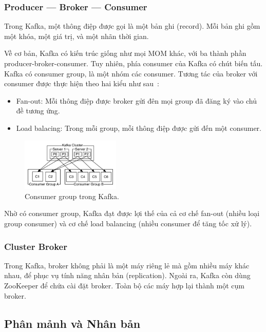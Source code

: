 \documentclass{article}
\begin{document}
\subsubsection{Producer --- Broker --- Consumer}

Trong Kafka, một thông điệp được gọi là một bản ghi (record). Mỗi bản ghi gồm
một khóa, một giá trị, và một nhãn thời gian.

Về cơ bản, Kafka có kiến trúc giống như mọi MOM khác, với ba thành phần
producer-broker-consumer. Tuy nhiên, phía consumer của Kafka có chút biến tấu.
Kafka có consumer group, là một nhóm các consumer. Tương tác của broker với
consumer được thực hiện theo hai kiểu như sau~\cite{kafka_detail}:

\begin{itemize}
    \item Fan-out: Mỗi thông điệp được broker gửi đên mọi group đã đăng ký vào
        chủ đề tương ứng.
    \item Load balacing: Trong mỗi group, mỗi thông điệp được gửi đến một
        consumer.
\end{itemize}

\begin{figure}
    \centering
    \includegraphics[width=0.42\textwidth]{consumer_groups.png}
    \caption{Consumer group trong Kafka.}
\end{figure}

Nhờ có consumer group, Kafka đạt được lợi thế của cả cơ chế fan-out (nhiều loại
group consumer) và cơ chế load balancing (nhiều consumer để tăng tốc xử lý).

\subsubsection{Cluster Broker}

Trong Kafka, broker không phải là một máy riêng lẻ mà gồm nhiều máy khác nhau,
để phục vụ tính năng nhân bản (replication). Ngoài ra, Kafka còn dùng ZooKeeper
để chứa cài đặt broker. Toàn bộ các máy hợp lại thành một cụm broker.

\subsection{Phân mảnh và Nhân bản}
\end{document}
